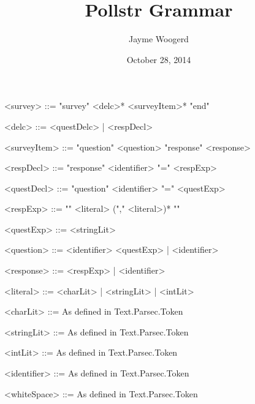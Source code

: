 \documentclass{article}
\title{Pollstr Grammar}
\author{Jayme Woogerd}
\date{October 28, 2014}
\begin{document}
\maketitle
\thispagestyle{empty}

\begin{grammar}

    <survey>     ::= "survey"  <delc>* <surveyItem>* "end"

    <delc>       ::= <questDelc> | <respDecl>

    <surveyItem> ::= "question" <question> "response" <response>

    <respDecl>   ::= "response" <identifier> "=" <respExp>

    <questDecl>  ::= "question" <identifier> "=" <questExp>

    <respExp>    ::= "{" <literal> ("," <literal>)* "}"

    <questExp>    ::= <stringLit>

    <question>   ::= <identifier> <questExp> |  <identifier>

    <response>   ::= <respExp> | <identifier>

    <literal>    ::= <charLit> | <stringLit> | <intLit>

    <charLit>    ::=  As defined in Text.Parsec.Token

    <stringLit>  ::= As defined in Text.Parsec.Token

    <intLit>     ::= As defined in Text.Parsec.Token

    <identifier> ::= As defined in Text.Parsec.Token

    <whiteSpace> ::= As defined in Text.Parsec.Token


\end{grammar}
\end{document}
